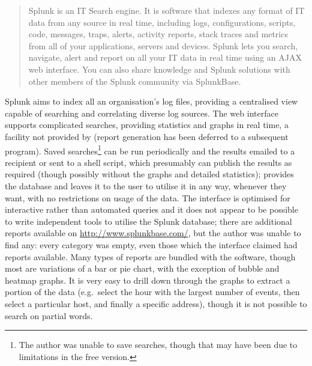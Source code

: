 \begin{quotation}

    Splunk is an IT Search engine. It is software that indexes any format
    of IT data from any source in real time, including logs,
    configurations, scripts, code, messages, traps, alerts, activity
    reports, stack traces and metrics from all of your applications,
    servers and devices. Splunk lets you search, navigate, alert and report
    on all your IT data in real time using an AJAX web interface. You can
    also share knowledge and Splunk solutions with other members of the
    Splunk community via SplunkBase.

\end{quotation}

Splunk aims to index all an organisation's log files, providing a
centralised view capable of searching and correlating diverse log sources.
The web interface supports complicated searches, providing statistics and
graphs in real time, a facility not provided by \parsername{} (report
generation has been deferred to a subsequent program).  Saved
searches\footnote{The author was unable to save searches, though that may
have been due to limitations in the free version.} can be run periodically
and the results emailed to a recipient or sent to a shell script, which
presumably can publish the results as required (though possibly without the
graphs and detailed statistics); \parsername{} provides the database and
leaves it to the user to utilise it in any way, whenever they want, with no
restrictions on usage of the data.  The interface is optimised for
interactive rather than automated queries and it does not appear to be
possible to write independent tools to utilise the Splunk database; there
are additional reports available on \url{http://www.splunkbase.com/}, but
the author was unable to find any: every category was empty, even those
which the interface claimed had reports available.  Many types of reports
are bundled with the software, though most are variations of a bar or pie
chart, with the exception of bubble and heatmap graphs.  It is very easy to
drill down through the graphs to extract a portion of the data (e.g.\
select the hour with the largest number of events, then select a particular
host, and finally a specific address), though it is not possible to search
on partial words.

